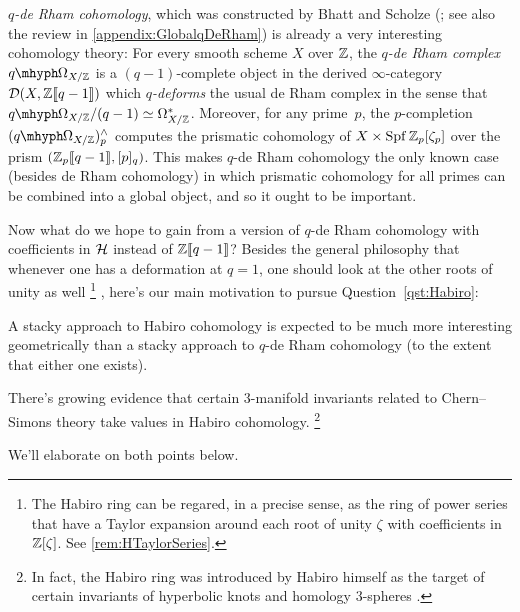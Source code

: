 \documentclass[DIV=12,numbers=enddot,leqno,bibliography=totoc]{scrartcl}
\begin{document}
	\begin{numpar}\label{par:WhyHabiroCohomology}
		\emph{$q$-de Rham cohomology}, which was constructed by Bhatt and Scholze (\cite{Toulouse,Prismatic}; see also the review in \cref{appendix:GlobalqDeRham}) is already a very interesting cohomology theory: For every smooth scheme $X$ over $\mathbb{Z}$, the \emph{$q$-de Rham complex} $\qOmega_{X/\IZ}$ is a $(q-1)$-complete object in the derived $\infty$-category $\mathcal{D}(X,\mathbb{Z}\llbracket q-1\rrbracket)$ which \emph{$q$-deforms} the usual de Rham complex in the sense that $\qOmega_{X/\IZ}/(q-1)\simeq \Omega_{X/\IZ}^*$. Moreover, for any prime~$p$, the $p$-completion $(\qOmega_{X/\IZ})_p^\complete$ computes the prismatic cohomology of $X\times\operatorname{Spf} \mathbb{Z}_p[\zeta_p]$ over the prism $(\mathbb{Z}_p\llbracket q-1\rrbracket,[p]_q)$. This makes $q$-de Rham cohomology the only known case (besides de Rham cohomology) in which prismatic cohomology for all primes can be combined into a global object, and so it ought to be important.
		
		Now what do we hope to gain from a version of $q$-de Rham cohomology with coefficients in $\mathcal{H}$ instead of $\mathbb{Z}\llbracket q-1\rrbracket$? Besides the general philosophy that whenever one has a deformation at $q=1$, one should look at the other roots of unity as well%
		\footnote{The Habiro ring can be regared, in a precise sense, as the ring of power series that have a Taylor expansion around each root of unity $\zeta$ with coefficients in $\mathbb{Z}[\zeta]$. See \cref{rem:HTaylorSeries}.}%
		, here's our main motivation to pursue Question~\cref{qst:Habiro}:
		\begin{alphanumerate}
			\item A stacky approach to Habiro cohomology is expected to be much more interesting geometrically than a stacky approach to $q$-de Rham cohomology (to the extent that either one exists).\label{enum:MotivationStackyApproach}
			\item There's growing evidence that certain $3$-manifold invariants related to Chern--Simons theory take values in Habiro cohomology.\label{enum:MotivationChernSimons}%
			\footnote{In fact, the Habiro ring was introduced by Habiro himself as the target of certain invariants of hyperbolic knots and homology $3$-spheres \cite{Habiro,HabiroInvariants}.}
		\end{alphanumerate}
		We'll elaborate on both points below.
	\end{numpar}
\end{document}
